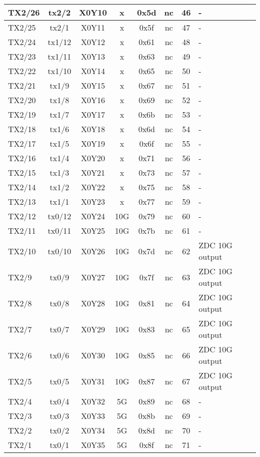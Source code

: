 \begin{longtable}{|l|c|c|c|c|c|c|l|}
TX2/26 & tx2/2  & X0Y10 &  x   & 0x5d & nc & 46 & -\\\hline
TX2/25 & tx2/1  & X0Y11 &  x   & 0x5f & nc & 47 & -\\\hline
TX2/24 & tx1/12 & X0Y12 &  x   & 0x61 & nc & 48 & -\\\hline
TX2/23 & tx1/11 & X0Y13 &  x   & 0x63 & nc & 49 & -\\\hline
TX2/22 & tx1/10 & X0Y14 &  x   & 0x65 & nc & 50 & -\\\hline
TX2/21 & tx1/9  & X0Y15 &  x   & 0x67 & nc & 51 & -\\\hline
TX2/20 & tx1/8  & X0Y16 &  x   & 0x69 & nc & 52 & -\\\hline
TX2/19 & tx1/7  & X0Y17 &  x   & 0x6b & nc & 53 & -\\\hline
TX2/18 & tx1/6  & X0Y18 &  x   & 0x6d & nc & 54 & -\\\hline
TX2/17 & tx1/5  & X0Y19 &  x   & 0x6f & nc & 55 & -\\\hline
TX2/16 & tx1/4  & X0Y20 &  x   & 0x71 & nc & 56 & -\\\hline
TX2/15 & tx1/3  & X0Y21 &  x   & 0x73 & nc & 57 & -\\\hline
TX2/14 & tx1/2  & X0Y22 &  x   & 0x75 & nc & 58 & -\\\hline
TX2/13 & tx1/1  & X0Y23 &  x   & 0x77 & nc & 59 & -\\\hline
TX2/12 & tx0/12 & X0Y24 & 10G & 0x79 & nc & 60 & -\\\hline
TX2/11 & tx0/11 & X0Y25 & 10G & 0x7b & nc & 61 & -\\\hline
TX2/10 & tx0/10 & X0Y26 & 10G & 0x7d & nc & 62 & ZDC 10G output\\\hline
TX2/9  & tx0/9  & X0Y27 & 10G & 0x7f & nc & 63 & ZDC 10G output\\\hline
TX2/8  & tx0/8  & X0Y28 & 10G & 0x81 & nc & 64 & ZDC 10G output\\\hline
TX2/7  & tx0/7  & X0Y29 & 10G & 0x83 & nc & 65 & ZDC 10G output\\\hline
TX2/6  & tx0/6  & X0Y30 & 10G & 0x85 & nc & 66 & ZDC 10G output\\\hline
TX2/5  & tx0/5  & X0Y31 & 10G & 0x87 & nc & 67 & ZDC 10G output\\\hline
TX2/4  & tx0/4  & X0Y32 &  5G & 0x89 & nc & 68 & -\\\hline
TX2/3  & tx0/3  & X0Y33 &  5G & 0x8b & nc & 69 & -\\\hline
TX2/2  & tx0/2  & X0Y34 &  5G & 0x8d & nc & 70 & -\\\hline
TX2/1  & tx0/1  & X0Y35 &  5G & 0x8f & nc & 71 & -\\\hline
\end{longtable}

